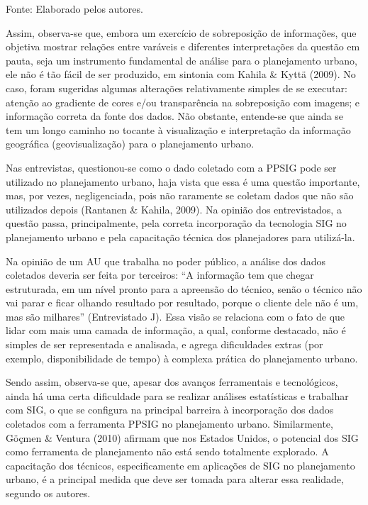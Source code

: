 \documentclass{article}
\begin{document}
\begin{multicols}{2}
Fonte: Elaborado pelos autores.

Assim, observa-se que, embora um exercício de sobreposição de informações, que
objetiva mostrar relações entre varáveis e diferentes interpretações da questão
em pauta, seja um instrumento fundamental de análise para o planejamento urbano,
ele não é tão fácil de ser produzido, em sintonia com Kahila \& Kyttä (2009). No
caso, foram sugeridas
algumas alterações relativamente simples de se executar: atenção ao gradiente de
cores e/ou transparência na sobreposição com imagens; e informação correta da
fonte dos dados. Não obstante, entende-se que ainda se tem um longo caminho no
tocante à visualização e interpretação da informação geográfica
(geovisualização) para o planejamento urbano.

Nas entrevistas, questionou-se como o dado coletado com a PPSIG pode ser
utilizado no planejamento urbano, haja vista que essa é uma questão importante,
mas, por vezes, negligenciada, pois não raramente se coletam dados que não são
utilizados depois (Rantanen \& Kahila,
2009). Na opinião dos entrevistados, a questão passa, principalmente,
pela correta incorporação da tecnologia SIG no planejamento urbano e pela
capacitação técnica dos planejadores para utilizá-la.

Na opinião de um AU que trabalha no poder público, a análise dos dados coletados
deveria ser feita por terceiros: “A informação tem que chegar
estruturada, em um nível pronto para a apreensão do técnico, senão o técnico
não vai parar e ficar olhando resultado por resultado, porque o cliente dele
não é um, mas são milhares” (Entrevistado J). Essa visão se
relaciona com o fato de que lidar com mais uma camada de informação, a qual,
conforme destacado, não é simples de ser representada e analisada, e agrega
dificuldades extras (por exemplo, disponibilidade de tempo) à complexa prática
do planejamento urbano.

Sendo assim, observa-se que, apesar dos avanços ferramentais e tecnológicos,
ainda há uma certa dificuldade para se realizar análises estatísticas e
trabalhar com SIG, o que se configura na principal barreira à incorporação dos
dados coletados com a ferramenta PPSIG no planejamento urbano. Similarmente,
Göçmen \& Ventura (2010) afirmam
que nos Estados Unidos, o potencial dos SIG como ferramenta de planejamento não
está sendo totalmente explorado. A capacitação dos técnicos, especificamente em
aplicações de SIG no planejamento urbano, é a principal medida que deve ser
tomada para alterar essa realidade, segundo os autores.


\end{multicols}
\end{document}
